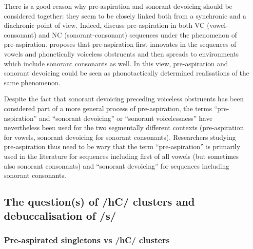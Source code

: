 \documentclass[output=paper]{langscibook}
\begin{document}
There is a good reason why pre\hyp aspiration and sonorant devoicing should be considered together: they seem to be closely linked both from a synchronic and a diachronic point of view. Indeed, \citet[70]{LadefogedMaddieson1996} discuss pre\hyp aspiration in both VC (vowel-consonant) and NC (sonorant-consonant) sequences under the phenomenon of pre-aspiration. \citet{Hejná2016c} proposes that pre\hyp aspiration first innovates in the sequences of vowels and phonetically voiceless obstruents and then spreads to environments which include sonorant consonants as well. In this view, pre\hyp aspiration and sonorant devoicing could be seen as phonotactically determined realisations of the same phenomenon.

Despite the fact that sonorant devoicing preceding voiceless obstruents has been considered part of a more general process of pre-aspiration, the terms “pre-aspiration” and “sonorant devoicing” or “sonorant voicelessness” have nevertheless been used for the two segmentally different contexts (pre-aspiration for vowels, sonorant devoicing for sonorant consonants). Researchers studying pre\hyp aspiration thus need to be wary that the term “pre-aspiration” is primarily used in the literature for sequences including first of all vowels (but sometimes also sonorant consonants) and “sonorant devoicing” for sequences including sonorant consonants.

\subsection{The question(s) of /hC/ clusters and debuccalisation of /s/}\label{sec:hejna:2.3}
\subsubsection{Pre-aspirated singletons vs /hC/ clusters}
\end{document}
